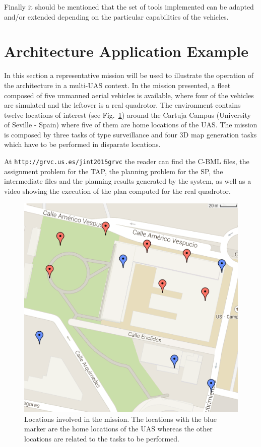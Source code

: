 \documentclass[twocolumn]{svjour3}          %
\begin{document}
Finally it should be mentioned that the set of tools implemented can be adapted and/or extended depending on the particular capabilities of the vehicles. 

\section{Architecture Application Example}
\label{sec:results}

In this section a representative mission will be used to illustrate the operation of the architecture in a multi-UAS context. In the mission presented, a fleet composed of five unmanned aerial vehicles is available, where four of the vehicles are simulated and the leftover is a real quadrotor. The environment contains twelve locations of interest (see Fig.~\ref{fig:locations}) around the Cartuja Campus (University of Seville - Spain) where five of them are home locations of the UAS. The mission is composed by three tasks of type surveillance and four 3D map generation tasks which have to be performed in disparate locations. 

At \verb+http://grvc.us.es/jint2015grvc+ the reader can find the C-BML files, the assignment problem for the TAP, the planning problem for the SP, the intermediate files and the planning results generated by the system, as well as a video showing the execution of the plan computed for the real quadrotor.

\begin{figure}
    \centering
    \includegraphics[width=1.0\columnwidth]{mission.png}
    \caption[Locations involved in the mission.]{Locations involved in the mission. The locations with the blue marker are the home locations of the UAS whereas the other locations are related to the tasks to be performed.}
    \label{fig:locations}
\end{figure}
 
\end{document}
